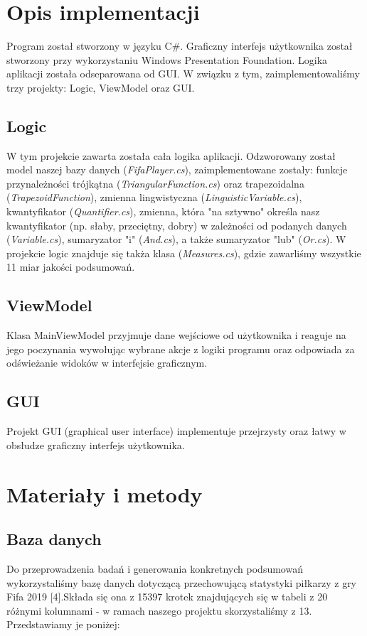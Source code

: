 \documentclass{classrep}
\begin{document}
\section{Opis implementacji}
Program został stworzony w języku C\#. Graficzny interfejs użytkownika został stworzony przy  wykorzystaniu Windows Presentation Foundation. Logika aplikacji została odseparowana od GUI. W związku z tym, zaimplementowaliśmy trzy projekty: Logic, ViewModel oraz GUI.

\subsection{Logic}
W tym projekcie zawarta została cała logika aplikacji. Odzworowany został model naszej bazy danych (\emph{FifaPlayer.cs}), zaimplementowane zostały: funkcje przynależności trójkątna (\emph{TriangularFunction.cs}) oraz trapezoidalna (\emph{TrapezoidFunction}), zmienna lingwistyczna (\emph{LinguisticVariable.cs}), kwantyfikator (\emph{Quantifier.cs}), zmienna, która "na sztywno" określa nasz kwantyfikator (np. słaby, przeciętny, dobry) w zależności od podanych danych (\emph{Variable.cs}), sumaryzator "i" (\emph{And.cs}), a także sumaryzator "lub" (\emph{Or.cs}). W projekcie logic znajduje się takża klasa (\emph{Measures.cs}), gdzie zawarliśmy wszystkie 11 miar jakości podsumowań.
 
\subsection{ViewModel}

Klasa MainViewModel przyjmuje dane wejściowe od użytkownika i reaguje na jego poczynania wywołując wybrane akcje z logiki programu oraz odpowiada za odświeżanie widoków w interfejsie graficznym.

\subsection{GUI}

Projekt GUI (graphical user interface) implementuje przejrzysty oraz łatwy w obsłudze graficzny interfejs użytkownika.

\section{Materiały i metody}

\subsection{Baza danych}
Do przeprowadzenia badań i generowania konkretnych podsumowań wykorzystaliśmy bazę danych dotyczącą przechowującą statystyki piłkarzy z gry Fifa 2019 [4].Składa się ona z 15397 krotek znajdujących się w tabeli z 20 różnymi kolumnami - w ramach naszego projektu skorzystaliśmy z 13. Przedstawiamy je poniżej:
\end{document}
